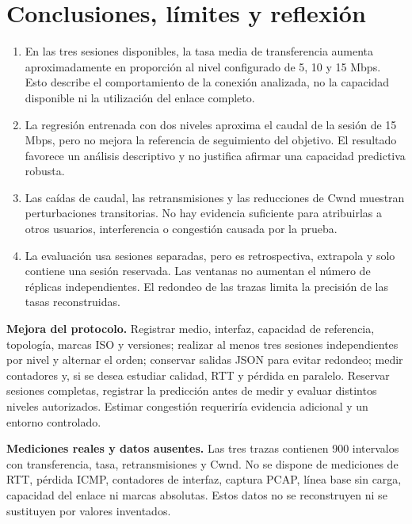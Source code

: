 \documentclass[11pt,letterpaper]{article}
\begin{document}
\newpage
\section{Conclusiones, límites y reflexión}
\begin{enumerate}
\item En las tres sesiones disponibles, la tasa media de transferencia aumenta aproximadamente en proporción al nivel configurado de 5, 10 y 15 Mbps. Esto describe el comportamiento de la conexión analizada, no la capacidad disponible ni la utilización del enlace completo.
\item La regresión entrenada con dos niveles aproxima el caudal de la sesión de 15 Mbps, pero no mejora la referencia de seguimiento del objetivo. El resultado favorece un análisis descriptivo y no justifica afirmar una capacidad predictiva robusta.
\item Las caídas de caudal, las retransmisiones y las reducciones de Cwnd muestran perturbaciones transitorias. No hay evidencia suficiente para atribuirlas a otros usuarios, interferencia o congestión causada por la prueba.
\item La evaluación usa sesiones separadas, pero es retrospectiva, extrapola y solo contiene una sesión reservada. Las ventanas no aumentan el número de réplicas independientes. El redondeo de las trazas limita la precisión de las tasas reconstruidas.
\end{enumerate}

\textbf{Mejora del protocolo.} Registrar medio, interfaz, capacidad de referencia, topología, marcas ISO y versiones; realizar al menos tres sesiones independientes por nivel y alternar el orden; conservar salidas JSON para evitar redondeo; medir contadores y, si se desea estudiar calidad, RTT y pérdida en paralelo. Reservar sesiones completas, registrar la predicción antes de medir y evaluar distintos niveles autorizados. Estimar congestión requeriría evidencia adicional y un entorno controlado.

\textbf{Mediciones reales y datos ausentes.} Las tres trazas contienen 900 intervalos con transferencia, tasa, retransmisiones y Cwnd. No se dispone de mediciones de RTT, pérdida ICMP, contadores de interfaz, captura PCAP, línea base sin carga, capacidad del enlace ni marcas absolutas. Estos datos no se reconstruyen ni se sustituyen por valores inventados.
\end{document}
